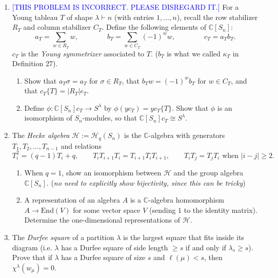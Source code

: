 \documentclass[12pt]{article}
\newcommand{\C}{\mathbb{C}}
\newcommand{\End}{\text{End}}
\begin{document}
\begin{enumerate}
\item[4.] \textcolor{blue}{[THIS PROBLEM IS INCORRECT. PLEASE DISREGARD IT.]}
For a Young tableau $T$ of shape $\lambda \vdash n$ (with entries $1,\ldots,n$), recall the row stabilizer $R_T$ and column stabilizer $C_T$. Define the following elements of $\C[S_n]$:
\[
a_T = \sum_{w\in R_T} w, \qquad\qquad b_T = \sum_{w\in C_T} (-1)^w w, \qquad\qquad c_T = a_T b_T.
\]
$c_T$ is the \emph{Young symmetrizer} associated to $T$. ($b_T$ is what we called $\kappa_T$ in Definition 27).

\begin{enumerate}
\item Show that $a_T \sigma = a_T$ for $\sigma \in R_T$, that $b_T w = (-1)^w b_T$ for $w\in C_T$, and that $c_T\{T\} = |R_T| e_T$.
\item Define $\phi: \C[S_n]c_T \to S^\lambda$ by $\phi(yc_T) = yc_T\{T\}$. Show that $\phi$ is an isomorphism of $S_n$-modules, so that $\C[S_n]c_T \cong S^\lambda$.
\end{enumerate}


\item[5.] The \emph{Hecke algebra} $\mathcal{H} 
:= \mathcal{H}_q(S_n)$ is the $\C$-algebra with generators $T_1,T_2,\ldots,T_{n-1}$ and relations
\[
T_i^2 = (q-1)T_i + q,\qquad T_iT_{i+1}T_i = T_{i+1}T_iT_{i+1}, \qquad T_iT_j=T_jT_i \text{ when } |i-j|\ge 2.
\]

\begin{enumerate}
    \item When $q=1$, show an isomorphism between $\mathcal{H}$ and the group algebra $\C[S_n]$. (\emph{no need to explicitly show bijectivity, since this can be tricky})
    \item A representation of an algebra $A$ is a $\C$-algebra homomorphism $A\to\End(V)$ for some vector space $V$ (sending $1$ to the identity matrix). Determine the one-dimensional representations of $\mathcal{H}$.
\end{enumerate}


\item[6.] The \emph{Durfee square} of a partition $\lambda$ is the largest square that fits inside its diagram (i.e. $\lambda$ has a Durfee square of side length $\ge s$ if and only if $\lambda_s\ge s$). Prove that if $\lambda$ has a Durfee square of size $s$ and $\ell(\mu)<s$, then $\chi^\lambda(w_\mu)=0$.

\end{enumerate}
\end{document}
